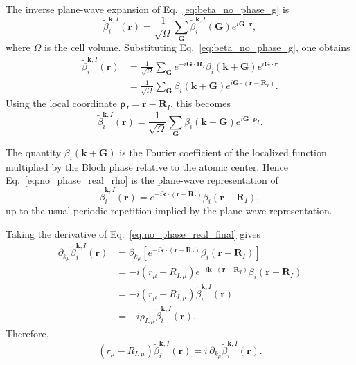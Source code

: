 \documentclass[11pt]{article}
\begin{document}
The inverse plane-wave expansion of Eq.~\eqref{eq:beta_no_phase_g} is
\begin{equation}
\widetilde{\beta}_{i}^{\mathbf k,I}(\mathbf r)
=
\frac{1}{\sqrt{\Omega}}
\sum_{\mathbf G}
\widetilde{\beta}_{i}^{\mathbf k,I}(\mathbf G)
e^{i\mathbf G\cdot\mathbf r},
\label{eq:inverse_pw_no_phase}
\end{equation}
where $\Omega$ is the cell volume. Substituting
Eq.~\eqref{eq:beta_no_phase_g}, one obtains
\begin{align}
\widetilde{\beta}_{i}^{\mathbf k,I}(\mathbf r)
&=
\frac{1}{\sqrt{\Omega}}
\sum_{\mathbf G}
e^{-i\mathbf G\cdot\mathbf R_I}
\beta_i(\mathbf k+\mathbf G)
e^{i\mathbf G\cdot\mathbf r}
\nonumber\\
&=
\frac{1}{\sqrt{\Omega}}
\sum_{\mathbf G}
\beta_i(\mathbf k+\mathbf G)
e^{i\mathbf G\cdot(\mathbf r-\mathbf R_I)} .
\label{eq:no_phase_real_sum}
\end{align}
Using the local coordinate
$\boldsymbol{\rho}_I=\mathbf r-\mathbf R_I$, this becomes
\begin{equation}
\widetilde{\beta}_{i}^{\mathbf k,I}(\mathbf r)
=
\frac{1}{\sqrt{\Omega}}
\sum_{\mathbf G}
\beta_i(\mathbf k+\mathbf G)
e^{i\mathbf G\cdot\boldsymbol{\rho}_I}.
\label{eq:no_phase_real_rho}
\end{equation}

The quantity $\beta_i(\mathbf k+\mathbf G)$ is the Fourier coefficient
of the localized function multiplied by the Bloch phase relative to the
atomic center. Hence Eq.~\eqref{eq:no_phase_real_rho} is the
plane-wave representation of
\begin{equation}
\widetilde{\beta}_{i}^{\mathbf k,I}(\mathbf r)
=
e^{-i\mathbf k\cdot(\mathbf r-\mathbf R_I)}
\beta_i(\mathbf r-\mathbf R_I),
\label{eq:no_phase_real_final}
\end{equation}
up to the usual periodic repetition implied by the plane-wave
representation.

Taking the derivative of Eq.~\eqref{eq:no_phase_real_final} gives
\begin{align}
\partial_{k_\mu}
\widetilde{\beta}_{i}^{\mathbf k,I}(\mathbf r)
&=
\partial_{k_\mu}
\left[
e^{-i\mathbf k\cdot(\mathbf r-\mathbf R_I)}
\beta_i(\mathbf r-\mathbf R_I)
\right]
\nonumber\\
&=
-i(r_\mu-R_{I,\mu})
e^{-i\mathbf k\cdot(\mathbf r-\mathbf R_I)}
\beta_i(\mathbf r-\mathbf R_I)
\nonumber\\
&=
-i(r_\mu-R_{I,\mu})
\widetilde{\beta}_{i}^{\mathbf k,I}(\mathbf r)
\nonumber\\
&=
-i\rho_{I,\mu}
\widetilde{\beta}_{i}^{\mathbf k,I}(\mathbf r).
\label{eq:no_phase_der_real}
\end{align}
Therefore,
\begin{equation}
(r_\mu-R_{I,\mu})
\widetilde{\beta}_{i}^{\mathbf k,I}(\mathbf r)
=
i\,
\partial_{k_\mu}
\widetilde{\beta}_{i}^{\mathbf k,I}(\mathbf r).
\label{eq:rho_der_identity}
\end{equation}
\end{document}
